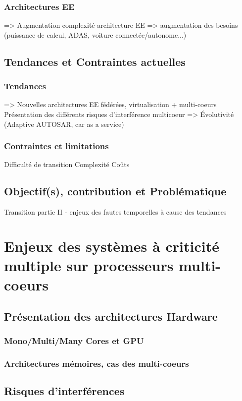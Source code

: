 \documentclass[french, a4paper, 11pt, twoside]{StyleThese}
\begin{document}
        \subsection{Architectures EE}
            => Augmentation complexité architecture EE
            => augmentation des besoins (puissance de calcul, ADAS, voiture connectée/autonome...)
    \section{Tendances et Contraintes actuelles}
        \subsection{Tendances}
            => Nouvelles architectures EE fédérées, virtualisation + multi-coeurs
                Présentation des différents risques d'interférence multicoeur
            => Évolutivité (Adaptive AUTOSAR, car as a service)
        \subsection{Contraintes et limitations}
            Difficulté de transition
            Complexité
            Coûts
    \section{Objectif(s), contribution et Problématique}
        Transition partie II - enjeux des fautes temporelles à cause des tendances
\chapter{Enjeux des systèmes à criticité multiple sur processeurs multi-coeurs}
    \section{Présentation des architectures Hardware}
        \subsection{Mono/Multi/Many Cores et GPU}
        \subsection{Architectures mémoires, cas des multi-coeurs}
    \section{Risques d'interférences}
\end{document}
